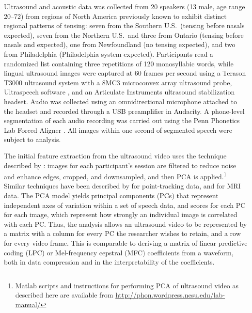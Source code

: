 \documentclass[output=paper]{LSP/langsci}
\begin{document}
Ultrasound and acoustic data was collected from 20 speakers (13 male, age range 20--72) from regions of North America previously known to exhibit distinct regional patterns of \ips{\ae} tensing: seven from the Southern U.S.~(tensing before nasals expected), seven from the Northern U.S.~and three from Ontario (tensing before nasals and  expected), one from Newfoundland (no tensing expected), and two from Philadelphia (Philadelphia system expected). Participants read a randomized list containing three repetitions of 120 monosyllabic words, while lingual ultrasound images were captured at 60 frames per second using a Terason T3000 ultrasound system with a 8MC3 microconvex array ultrasound probe, Ultraspeech software \citep{hueber_eigentongue_2007}, and an Articulate Instruments ultrasound stabilization headset.  Audio was collected using an omnidirectional microphone attached to the headset and recorded through a USB preamplifier in Audacity. A phone-level segmentation of each audio recording was carried out using the Penn Phonetics Lab Forced Aligner \citep{yuan_speaker_2008}.  All images within one second of segmented speech were subject to analysis.

The initial feature extraction from the ultrasound video uses the technique described by \citet{hueber_eigentongue_2007}: images for each participant's session are filtered to reduce noise and enhance edges, cropped, and downsampled, and then PCA is applied.\footnote{Matlab scripts and instructions for performing PCA of ultrasound video as described here are available from \href{http://phon.wordpress.ncsu.edu/lab-manual/}{http://phon.wordpress.ncsu.edu/lab-manual/}}  Similar techniques have been described by \citet{story_time_2007} for point-tracking data, and \citet{carignan_real-time_2015} for MRI data.  The PCA model yields principal components (PCs) that represent independent axes of variation within a set of speech data, and scores for each PC for each image, which represent how strongly an individual image is correlated with each PC. Thus, the analysis allows an ultrasound video to be represented by a matrix with a column for every PC the researcher wishes to retain, and a row for every video frame.  This is comparable to deriving a matrix of linear predictive coding (LPC) or Mel-frequency cepstral (MFC) coefficients from a waveform, both in data compression and in the interpretability of the coefficients. 
\end{document}
